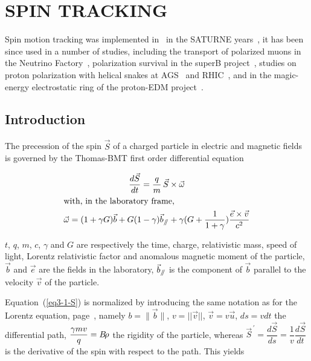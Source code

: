 \clearemptydoublepage

\section[SPIN TRACKING]{SPIN TRACKING~\protect}\label{sec3}   %


Spin motion tracking was  implemented in \zgou\ in the SATURNE years~\cite{Biblio7}, 
it has been since  used in a number of studies, including the transport of polarized muons 
 in the Neutrino Factory~\cite{polarNuFact}, 
polarization survival in the superB project~\cite{polarSuperB}, 
studies on proton polarization with helical snakes
at AGS~\cite{polarAGS} and RHIC~\cite{polarRHIC},  
and in the magic-energy electrostatic ring of the proton-EDM project~\cite{polarPEDM}. 


\subsection{Introduction}

The precession  of the spin $ \vec  S $ of a charged particle in electric and magnetic fields 
is governed by the Thomas-BMT first order differential equation~\cite{Biblio8}       %

\begin{gather}
	\dfrac{d\vec  S }{ dt} = \dfrac{q }{  m} \, \vec  S\times\vec  \omega
	     \label{eq3-1-S}  \\
\intertext{with, in the laboratory frame, }
	\vec  \omega  = (1+\gamma G)\vec  b + G(1-\gamma )\vec  b_{\mathrel{/\kern-.25em/}} + \gamma(G + \dfrac{1}{1+\gamma})  \dfrac{\vec e \times \vec v}{c^2}   \label{eq3-2-S}  
\end{gather}

\noindent $t$, $ q$, $m$, $c$, $\gamma$ and $ G $ are respectively the time, charge, 
relativistic mass, speed of light, Lorentz relativistic factor  and anomalous magnetic moment of the 
particle, $\vec b$ and $\vec e$ are the fields in the laboratory, $ \vec  b_{\mathrel{/\kern-.25em/}} $ is the component of $ \vec  b $ 
parallel to the velocity $ \vec  v $ of the particle. 

\noindent Equation~(\ref{eq3-1-S}) is normalized by introducing the same notation 
as for the Lorentz equation, page~\pageref{eq2-2-2}, 
namely  $ b=\parallel\vec  b\parallel $, $v=||\vec v||$, $ \vec v= v \vec u$, 
$ ds=vdt $ the differential path, $ \dfrac{\gamma mv }{ q} = B\!\rho $  the rigidity of the particle, 
whereas $ \vec  S^{\,\prime} = \dfrac{d\vec  S }{ ds} = \dfrac{1 }{ v}\dfrac{d\vec  S }{ dt} $ 
 is the derivative of the spin with respect to the path.  This yields

